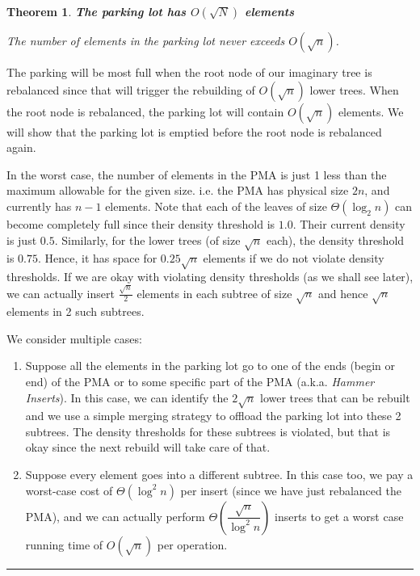 \documentclass{article}
\newenvironment{proof}{{\bf Proof:  }}{\hfill\rule{2mm}{2mm}}
\newtheorem{theorem}[fact]{Theorem}
\begin{document}
\begin{theorem}
\textbf{The parking lot has $O(\sqrt{N})$ elements}

The number of elements in the parking lot never exceeds $O(\sqrt{n})$.
\end{theorem}

\begin{proof}
The parking will be most full when the root node of our imaginary tree
is rebalanced since that will trigger the rebuilding of $O(\sqrt{n})$
lower trees. When the root node is rebalanced, the parking lot will
contain $O(\sqrt{n})$ elements. We will show that the parking lot is
emptied before the root node is rebalanced again.

In the worst case, the number of elements in the PMA is just 1 less
than the maximum allowable for the given size. i.e. the PMA has
physical size $2n$, and currently has $n-1$ elements. Note that each
of the leaves of size $\Theta(\log_2{n})$ can become completely full
since their density threshold is $1.0$. Their current density is just
$0.5$. Similarly, for the lower trees (of size $\sqrt{n}$ each), the
density threshold is $0.75$. Hence, it has space for $0.25\sqrt{n}$
elements if we do not violate density thresholds. If we are okay with
violating density thresholds (as we shall see later), we can actually
insert $\frac{\sqrt{n}}{2}$ elements in each subtree of size
$\sqrt{n}$ and hence $\sqrt{n}$ elements in 2 such subtrees.

We consider multiple cases:

\begin{enumerate}

\item Suppose all the elements in the parking lot go to one of the
  ends (begin or end) of the PMA or to some specific part of the PMA
  (a.k.a. \textit{Hammer Inserts}). In this case, we can identify the
  $2\sqrt{n}$ lower trees that can be rebuilt and we use a simple
  merging strategy to offload the parking lot into these 2
  subtrees. The density thresholds for these subtrees is violated, but
  that is okay since the next rebuild will take care of that.

\item Suppose every element goes into a different subtree. In this
  case too, we pay a worst-case cost of $\Theta(\log^2{n})$ per insert
  (since we have just rebalanced the PMA), and we can actually perform
  $\Theta\left(\dfrac{\sqrt{n}}{\log^2{n}}\right)$ inserts to get a
  worst case running time of $O(\sqrt{n})$ per operation.


\end{enumerate}
\end{proof}
\end{document}
